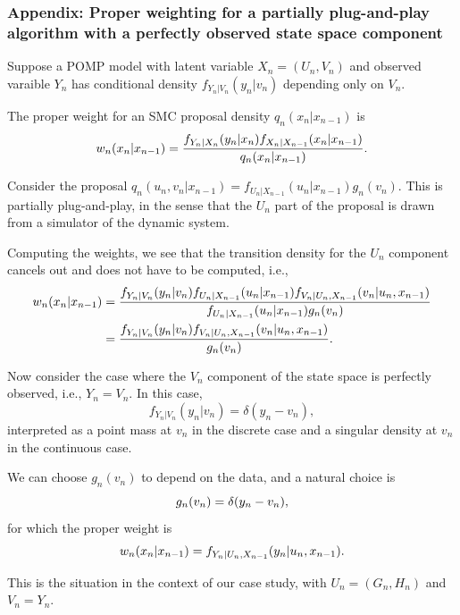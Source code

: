 \documentclass{beamer}\usepackage[]{graphicx}\usepackage[]{color}
\begin{document}
\begin{frame}[fragile]

\frametitle{Appendix: Proper weighting for a partially plug-and-play algorithm with a perfectly observed state space component}

\bi

\item Suppose a POMP model with latent variable $X_n=(U_n,V_n)$ and observed varaible $Y_n$ has conditional density $f_{Y_n|V_n}(y_n|v_n)$ depending only on $V_n$. 

\item The proper weight for an SMC proposal density $q_n(x_n|x_{n-1})$ is
$$ 
w_{n}(x_n|x_{n-1}) = \frac{f_{Y_n|X_n}(y_n|x_n)f_{X_n|X_{n-1}}(x_n|x_{n-1})}{q_n(x_n|x_{n-1})}.
$$

\item Consider the  proposal
$q_n(u_n,v_n|x_{n-1}) = f_{U_n|X_{n-1}}(u_n|x_{n-1}) g_n(v_n)$.
This is partially plug-and-play, in the sense that the $U_n$ part of the proposal is drawn from a simulator of the dynamic system. 

\item Computing the weights, we see that the transition density for the $U_n$ component cancels out and does not have to be computed, i.e.,
\ei
$$\begin{aligned}
w_{n}(x_n|x_{n-1}) &= \frac{f_{Y_n|V_n}(y_n|v_n)f_{U_n|X_{n-1}}(u_n|x_{n-1})f_{V_n|U_n,X_{n-1}}(v_n|u_n,x_{n-1})}{f_{U_n|X_{n-1}}(u_n|x_{n-1}) g_n(v_n)} \\
&= \frac{f_{Y_n|V_n}(y_n|v_n)f_{V_n|U_n,X_{n-1}}(v_n|u_n,x_{n-1})}{ g_n(v_n)}.
\end{aligned}
$$

\end{frame}

\begin{frame}[fragile]

\bi

\item Now consider the case where the $V_n$ component of the state space is perfectly observed, i.e., $Y_n=V_n$. In this case, 
$$ 
f_{Y_n|V_n}(y_n|v_n) = \delta(y_n-v_n),
$$
interpreted as a point mass at $v_n$ in the discrete case and a singular density at $v_n$ in the continuous case. 

\item We can choose $g_n(v_n)$ to depend on the data, and a natural choice is 
$$
g_n(v_n)=\delta(y_n-v_n),
$$
for which the proper weight is
$$
w_{n}(x_n|x_{n-1}) = f_{Y_n|U_n,X_{n-1}}(y_n|u_n,x_{n-1}).
$$

\item This is the situation in the context of our case study, with $U_n=(G_n,H_n)$ and $V_n=Y_n$.


\ei

\end{frame}  
\end{document}
